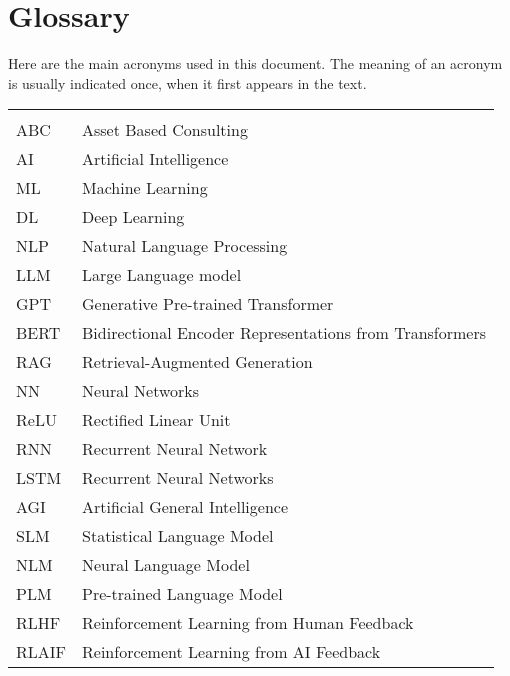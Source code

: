 \chapter*{Glossary}

Here are the main acronyms used in this document. The meaning of an acronym is usually indicated once, when it first appears in the text.

\begin{longtable}{lp{9cm}}
          &                                                         \\
    ABC   & Asset Based Consulting                                  \\
    AI    & Artificial Intelligence                                 \\
    ML    & Machine Learning                                        \\
    DL    & Deep Learning                                           \\
    NLP   & Natural Language Processing                             \\
    LLM   & Large Language model                                    \\
    GPT   & Generative Pre-trained Transformer                      \\
    BERT  & Bidirectional Encoder Representations from Transformers \\
    RAG   & Retrieval-Augmented Generation                          \\
    NN    & Neural Networks                                         \\
    ReLU  & Rectified Linear Unit                                   \\
    RNN   & Recurrent Neural Network                                \\
    LSTM  & Recurrent Neural Networks                               \\
    AGI   & Artificial General Intelligence                         \\
    SLM   & Statistical Language Model                              \\
    NLM   & Neural Language Model                                   \\
    PLM   & Pre-trained Language Model                              \\
    RLHF  & Reinforcement Learning from Human Feedback              \\
    RLAIF & Reinforcement Learning from AI Feedback                 \\
\end{longtable}

